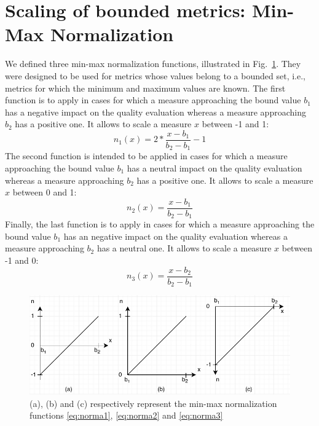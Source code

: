 \section{Scaling of bounded metrics: Min-Max Normalization} \label{subsubsec:norma} We defined three min-max normalization functions, illustrated in Fig.~\ref{fig:norma}. They were designed to be used for metrics whose values belong to a bounded set, i.e., metrics for which the minimum and maximum values are known. The first function is to apply in cases for which a measure approaching the bound value $b_1$ has a negative impact on the quality evaluation whereas a measure approaching $b_2$ has a positive one. It allows to scale a measure $x$ between -1 and 1:
\begin{equation}\label{eq:norma1}
n_1(x) = 2 * \dfrac{x-b_1}{b_2-b_1} -1
\end{equation}
The second function is intended to be applied in cases for which a measure approaching the bound value $b_1$ has a neutral impact on the quality evaluation whereas a measure approaching $b_2$ has a positive one. It allows to scale a measure $x$ between 0 and 1:
\begin{equation}\label{eq:norma2}
n_2(x) = \dfrac{x-b_1}{b_2-b_1}
\end{equation}
Finally, the last function is to apply in cases for which a measure approaching the bound value $b_1$ has an negative impact on the quality evaluation whereas a measure approaching $b_2$ has a neutral one. It allows to scale a measure $x$ between -1 and 0:
\begin{equation}\label{eq:norma3}
n_3(x) = \dfrac{x-b_2}{b_2-b_1}
\end{equation}
\begin{figure}[!htp]
	\centering
	\includegraphics[width=\linewidth]{figures/chapter2/norma.pdf}
	\caption{(a), (b) and (c) respectively represent the min-max normalization functions \eqref{eq:norma1}, \eqref{eq:norma2} and \eqref{eq:norma3}}
	\label{fig:norma}
\end{figure}

